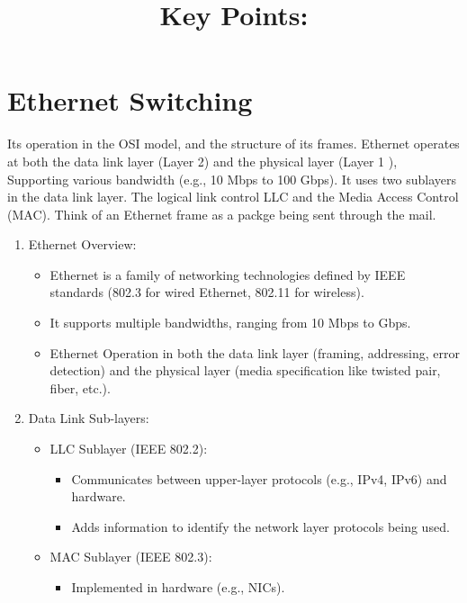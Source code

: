 \documentclass[a4paper,11pt]{article}
\begin{document}
\section{ Ethernet Switching}
Its operation in the OSI model, and the structure of its frames. Ethernet operates at both the data link layer (Layer 2) and the physical layer (Layer 1 ), Supporting various bandwidth (e.g., 10 Mbps to 100 Gbps). It uses two sublayers in the data link layer. The logical link control LLC and the Media Access Control (MAC). Think of an Ethernet frame as a packge being sent through the mail. \\
\title{Key Points:}
\begin{enumerate}
    \item Ethernet Overview:\\
    \begin{itemize}
        \item Ethernet is a family of networking technologies defined by IEEE standards (802.3 for wired Ethernet, 802.11 for wireless).\\
        \item It supports multiple bandwidths, ranging from 10 Mbps to Gbps.\\
        \item Ethernet Operation in both the data link layer (framing, addressing, error detection) and the physical layer (media specification like twisted pair, fiber, etc.).\\
    \end{itemize}
    \item Data Link Sub-layers:\\
    \begin{itemize}
        \item LLC Sublayer (IEEE 802.2):\\
        \begin{itemize}
            \item Communicates between upper-layer protocols (e.g., IPv4, IPv6) and hardware.\\
            \item Adds information to identify the network layer protocols being used.\\
        \end{itemize}
        \item MAC Sublayer (IEEE 802.3):\\
        \begin{itemize}
            \item Implemented in hardware (e.g., NICs).\\

\end{itemize}
\end{itemize}
\end{enumerate}
\end{document}
